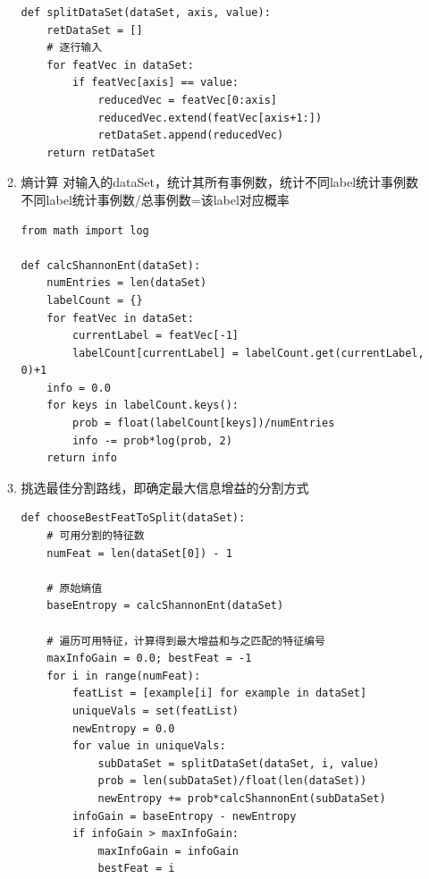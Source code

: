\documentclass[11pt]{ctexart}
\begin{document}
\begin{enumerate}
\begin{enumerate}
\begin{lstlisting}
def splitDataSet(dataSet, axis, value):
    retDataSet = []
    # 逐行输入
    for featVec in dataSet:
        if featVec[axis] == value:
            reducedVec = featVec[0:axis]
            reducedVec.extend(featVec[axis+1:])
            retDataSet.append(reducedVec)
    return retDataSet
\end{lstlisting}
\item 熵计算
对输入的dataSet，统计其所有事例数，统计不同label统计事例数
不同label统计事例数/总事例数=该label对应概率
\lstset{language=Python,label= ,caption= ,captionpos=b,numbers=none}
\begin{lstlisting}
from math import log

def calcShannonEnt(dataSet):
    numEntries = len(dataSet)
    labelCount = {}
    for featVec in dataSet:
        currentLabel = featVec[-1]
        labelCount[currentLabel] = labelCount.get(currentLabel, 0)+1
    info = 0.0
    for keys in labelCount.keys():
        prob = float(labelCount[keys])/numEntries
        info -= prob*log(prob, 2)
    return info
\end{lstlisting}
\item 挑选最佳分割路线，即确定最大信息增益的分割方式
\lstset{language=Python,label= ,caption= ,captionpos=b,numbers=none}
\begin{lstlisting}
def chooseBestFeatToSplit(dataSet):
    # 可用分割的特征数
    numFeat = len(dataSet[0]) - 1

    # 原始熵值
    baseEntropy = calcShannonEnt(dataSet)

    # 遍历可用特征，计算得到最大增益和与之匹配的特征编号
    maxInfoGain = 0.0; bestFeat = -1
    for i in range(numFeat):
        featList = [example[i] for example in dataSet]
        uniqueVals = set(featList)
        newEntropy = 0.0
        for value in uniqueVals:
            subDataSet = splitDataSet(dataSet, i, value)
            prob = len(subDataSet)/float(len(dataSet))
            newEntropy += prob*calcShannonEnt(subDataSet)
        infoGain = baseEntropy - newEntropy
        if infoGain > maxInfoGain:
            maxInfoGain = infoGain
            bestFeat = i


\end{lstlisting}
\end{enumerate}
\end{enumerate}
\end{document}

